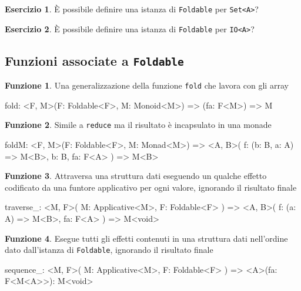 \documentclass[12pt]{article}
\theoremstyle{definition}
\newtheorem{exercise}{Esercizio}[section]
\newtheorem{function}{Funzione}[section]
\newenvironment{code}
  {\vspace{0.5cm} \VerbatimEnvironment\begin{typescriptcode}}
  {\end{typescriptcode} \vspace{0.2cm}}
\begin{document}
\begin{exercise}
È possibile definire una istanza di \texttt{Foldable} per \texttt{Set<A>}?
\end{exercise}

\begin{exercise}
È possibile definire una istanza di \texttt{Foldable} per \texttt{IO<A>}?
\end{exercise}

\subsection{Funzioni associate a \texttt{Foldable}}

\begin{function}
Una generalizzazione della funzione \texttt{fold} che lavora con gli array

\begin{code}
fold: <F, M>(F: Foldable<F>, M: Monoid<M>) => (fa: F<M>) => M
\end{code}
\end{function}

\begin{function}
Simile a \texttt{reduce} ma il risultato è incapsulato in una monade

\begin{code}
foldM: <F, M>(F: Foldable<F>, M: Monad<M>) => <A, B>(
  f: (b: B, a: A) => M<B>,
  b: B,
  fa: F<A>
) => M<B>
\end{code}
\end{function}

\begin{function}
Attraversa una struttura dati eseguendo un qualche effetto codificato da una funtore applicativo per ogni valore, ignorando il risultato finale

\begin{code}
traverse_: <M, F>(
  M: Applicative<M>,
  F: Foldable<F>
) => <A, B>(
  f: (a: A) => M<B>,
  fa: F<A>
) => M<void>
\end{code}
\end{function}

\begin{function}
Esegue tutti gli effetti contenuti in una struttura dati nell'ordine dato dall'istanza di \texttt{Foldable}, ignorando il risultato finale

\begin{code}
sequence_: <M, F>(
  M: Applicative<M>,
  F: Foldable<F>
) => <A>(fa: F<M<A>>): M<void>
\end{code}
\end{function}
\end{document}

